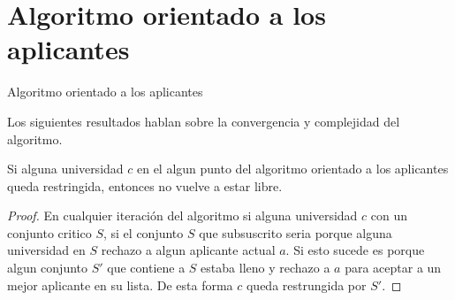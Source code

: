 \section{Algoritmo orientado a los aplicantes}

\IncMargin{1em}
\begin{Algoritmo}[H]

\BlankLine
{}
\caption{Algoritmo orientado a los aplicantes}
\end{Algoritmo}
\DecMargin{1em}

Los siguientes resultados hablan sobre la convergencia y complejidad del algoritmo.

\begin{lem}
\label{lemaAOA1}
Si alguna universidad $c$ en el algun punto del algoritmo orientado a los aplicantes queda restringida, entonces no vuelve a estar libre.
\end{lem}
\begin{proof}
En cualquier iteración del algoritmo si alguna universidad $c$ con un conjunto critico $S$, si el conjunto $S$ que subsuscrito seria porque alguna universidad en $S$ rechazo a algun aplicante actual $a$. Si esto sucede es porque algun conjunto $S'$
 que contiene a $S$ estaba lleno y rechazo a $a$ para aceptar a un mejor aplicante en su lista. De esta forma $c$ queda restrungida por $S'$.
\end{proof}

